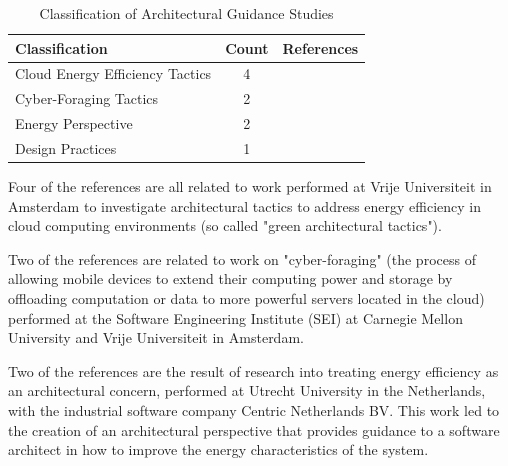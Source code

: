 \begin{table}
\caption{Classification of Architectural Guidance Studies}
\label{table:archguidancestudies}
\begin{center}
\begin{tabular}{| l | c | l |}
\hline

\textbf{Classification} & \textbf{Count} & \textbf{References} \\
\hline

Cloud Energy Efficiency Tactics & 4 & \cite{procaccianti2013-cloudenergyefficiency, procaccianti2014-greentactics, procaccianti2014-greentactics-wicsa, procaccianti2015-cloudenergy-litreview} \\
\hline

Cyber-Foraging Tactics & 2 & \cite{lewis2015-foragingtactics, lewis2016-foragingdm} \\
\hline

Energy Perspective & 2 & \cite{jagroep2015-energyperspective, jagroep2017-energyperspective} \\
\hline

Design Practices & 1 & \cite{procaccianti2016-twobestpractices} \\
\hline

\end{tabular}
\end{center}
\end{table}

Four of the references \cite{procaccianti2013-cloudenergyefficiency, procaccianti2014-greentactics-wicsa, procaccianti2015-cloudenergy-litreview} are all related to work performed at Vrije Universiteit in Amsterdam to investigate architectural tactics to address energy efficiency in cloud computing environments (so called "green architectural tactics").

Two of the references \cite{lewis2015-foragingtactics, lewis2016-foragingdm} are related to work on "cyber-foraging" (the process of allowing mobile devices to extend their computing power and storage by offloading computation or data to more powerful servers located in the cloud) performed at the Software Engineering Institute (SEI) at Carnegie Mellon University and  Vrije Universiteit in Amsterdam.

Two of the references \cite{jagroep2015-energyperspective, jagroep2017-energyperspective} are the result of research into treating energy efficiency as an architectural concern, performed at Utrecht University in the Netherlands, with the industrial software company Centric Netherlands BV.  This work led to the creation of an architectural perspective \cite{woods2005-perspectives} that provides guidance to a software architect in how to improve the energy characteristics of the system.

